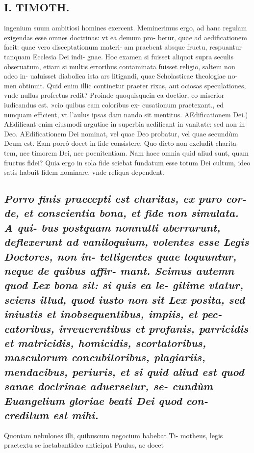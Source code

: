 \documentclass{article}
\begin{document}
\begin{pages}
\section*{I. TIMOTH. }
\marginpar{[ p.4 ]}\pstart ingenium suum ambitiosi homines exercent. Meminerimus ergo, ad hanc regulam exigendas esse omnes doctrinas: vt ea demum pro- betur, quae ad aedificationem facit: quae vero disceptationum materi- am praebent absque fructu, respuantur tanquam Ecclesia Dei indi- gnae. Hoc examen si fuisset aliquot supra seculis obseruatum, etiam si multis erroribus contaminata fuisset religio, saltem non adeo in- ualuisset diaboliea ista ars litigandi, quae Scholasticae theologiae no- men obtinuit. Quid enim illic continetur praeter rixas, aut ociosas speculationes, vnde nullus profectus redit? Proinde quoquisquein ea doctior, eo miserior iudicandus est. »cio quibus eam coloribus ex- cusationum praetexant., ed nunquam efficient, vt l'aulus ipsas dam nando sit mentitus.  \pend\pstart AEdificationem Dei.) AEdificant enim eiusmodi argutiae in superbia aedificant in vanitate: sed non in Deo. AEdificationem Dei nominat, vel quae Deo probatur, vel quae secundùm Deum est. Eam porrô docet in fide consistere. Quo dicto non excludit charita- tem, nec timorem Dei, nec poenitentiam. Nam haec omnia quid aliud sunt, quam fructus fidei? Quia ergo in sola fide sciebat fundatum esse totum Dei cultum, ideo satis habuit fidem nominare, vnde reliqua dependent.  \pend
{}
{}
\subsection*{\textit{Porro finis praecepti est charitas, ex puro cor- de, et conscientia bona, et fide non simulata. A qui- bus postquam nonnulli aberrarunt, deflexerunt ad vaniloquium, volentes esse Legis Doctores, non in- telligentes quae loquuntur, neque de quibus affir- mant. Scimus autemn quod Lex bona sit: si quis ea le- gitime vtatur, sciens illud, quod iusto non sit Lex posita, sed iniustis et inobsequentibus, impiis, et pec- catoribus, irreuerentibus et profanis, parricidis et matricidis, homicidis, scortatoribus, masculorum concubitoribus, plagiariis, mendacibus, periuris, et si quid aliud est quod sanae doctrinae aduersetur, se- cundùm Euangelium gloriae beati Dei quod con- creditum est mihi. }}\pstart Quoniam nebulones illi, quibuscum negocium habebat Ti- motheus, legis praetextu se iactabantideo anticipat Paulus, ac docet  \pend

\end{pages}
\end{document}
